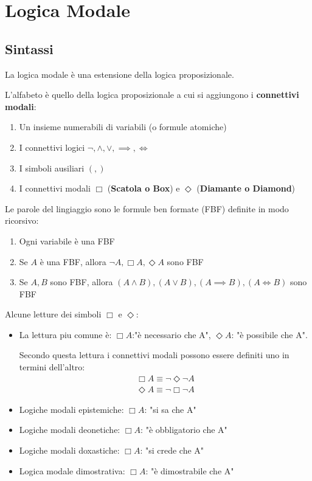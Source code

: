 \documentclass[../main.tex]{subfiles}
\begin{document}
\chapter{Logica Modale}
\section{Sintassi}
La logica modale è una estensione della logica proposizionale.

L'alfabeto è quello della logica proposizionale a cui si aggiungono i \textbf{connettivi modali}:
\begin{enumerate}
    \item Un insieme numerabili di variabili (o formule atomiche)
    \item I connettivi logici $\neg, \land, \lor, \implies, \iff$
    \item I simboli ausiliari $(,)$
    \item I connettivi modali $\Box$ (\textbf{Scatola o Box}) e $\Diamond$ (\textbf{Diamante o Diamond})
\end{enumerate}
Le parole del lingiaggio sono le formule ben formate (FBF) definite in modo ricorsivo:
\begin{enumerate}
    \item Ogni variabile è una FBF
    \item Se $A$ è una FBF, allora $\neg A, \Box A, \Diamond A$ sono FBF
    \item Se $A,B$ sono FBF, allora $(A \land B), (A \lor B), (A \implies B), (A \iff B)$ sono FBF
\end{enumerate}
Alcune letture dei simboli $\Box$ e $\Diamond$:
\begin{itemize}
    \item La lettura piu comune è: $\Box A$:"è necessario che A", $\Diamond A$: "è possibile che A".

          Secondo questa lettura i connettivi modali possono essere definiti uno in termini dell'altro:
          \begin{gather*}
              \Box A \equiv \neg \Diamond \neg A\\
              \Diamond A \equiv \neg \Box \neg A
          \end{gather*}
    \item Logiche modali epistemiche: $\Box A$: "si sa che A"
    \item Logiche modali deonetiche: $\Box A$: "è obbligatorio che A"
    \item Logiche modali doxastiche: $\Box A$: "si crede che A"
    \item Logica modale dimostrativa: $\Box A$: "è dimostrabile che A"
\end{itemize}
\end{document}
